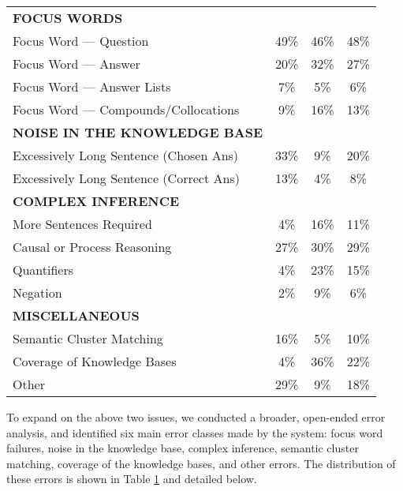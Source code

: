 \begin{table}[!tb]
\begin{center}
\begin{tabular}{lccc}
\hline
\textbf{FOCUS WORDS}  	& 		&		& 	\\
Focus Word --- Question 					& 	49\%		&	46\% 	& 	48\%	\\
Focus Word --- Answer 						& 	20\%		&	32\% 	& 	27\%	\\
Focus Word --- Answer Lists 				& 	7\%		&	5\%		& 	6\%	\\
Focus Word --- Compounds/Collocations 		& 	9\%		&	16\%		& 	13\%	\\
\hline
\textbf{NOISE IN THE KNOWLEDGE BASE}		& 			&			& 	\\
Excessively Long Sentence (Chosen Ans) 	& 	33\%		&	9\% 		& 	20\%	\\
Excessively Long Sentence (Correct Ans) 	& 	13\%		&	4\% 		& 	8\%	\\
\hline
\textbf{COMPLEX INFERENCE}				& 			&			& 	\\
More Sentences Required 					& 	4\%		&	16\% 	& 	11\%	\\
Causal or Process Reasoning 				& 	27\%		&	30\%		& 	29\%\\
Quantifiers	 							& 	4\%		&	23\% 	& 	15\%	\\
Negation	 								& 	2\%		&	9\% 		& 	6\%	\\
\hline
\textbf{MISCELLANEOUS}					& 			&			& 	\\
Semantic Cluster Matching				& 	16\%		&	5\%		& 	10\%\\
Coverage of Knowledge Bases				& 	4\%		&	36\%		& 	22\%\\
Other									& 	29\%		&	9\%		& 	18\%\\
\hline
\end{tabular}
\label{tab:errorclasses}
\end{center}
\end{table}

To expand on the above two issues, we conducted a broader, open-ended error analysis, and identified six main error classes made by the system: focus word failures, noise in the knowledge base, complex inference, semantic cluster matching, coverage of the knowledge bases, and other errors.  The distribution of these errors is shown in Table \ref{tab:errorclasses} and detailed below.

